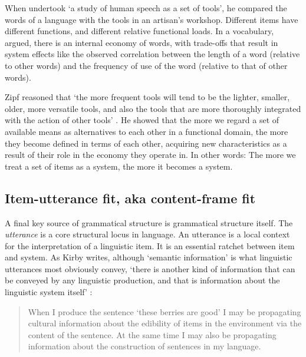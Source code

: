 When \citet[19ff]{zipf_human_1949} undertook \textquoteleft a study of human speech as a set of 
tools', he compared the words of a language with the tools in an 
artisan's workshop. Different items have different functions, and different relative functional loads. In a vocabulary, \citet[21]{zipf_human_1949} 
argued, there is an internal economy of words, with trade-offs 
that result in system effects like the observed correlation between 
the length of a word (relative to other words) and the frequency of use 
of the word (relative to that of other words). 



Zipf reasoned that \textquoteleft the more frequent tools will tend to be the lighter, 
smaller, older, more versatile tools, and also the tools that are more 
thoroughly integrated with the action of other tools' \citep[73]{zipf_human_1949}. He 
showed that the more we regard a set of available means as alternatives 
to each other in a functional domain, the more they become defined in 
terms of each other, acquiring new characteristics as a result of their 
role in the economy they operate in. In other words: The more we 
treat a set of items as a system, the more it becomes a system.



\subsection{Item-utterance fit, aka content-frame fit}
\label{itemutterance}

A final key source of grammatical structure is grammatical 
structure itself. The \textit{utterance }is a core structural locus in 
language. An utterance is a local context for the interpretation of a 
linguistic item. It is an essential ratchet between item 
and system. As Kirby writes, although \textquoteleft semantic information' is what 
linguistic utterances most obviously convey, \textquoteleft there is another kind of 
information that can be conveyed by any linguistic production, and that 
is information about the linguistic system itself' \citep[123]{kirby_transitions:_2013}: 

\begin{quotation}
When I produce the sentence \textquoteleft these berries are good' I may 
be propagating cultural information about the edibility of items in the 
environment via the content of the sentence. At the same time I may also 
be propagating information about the construction of sentences in my 
language.
\end{quotation}

